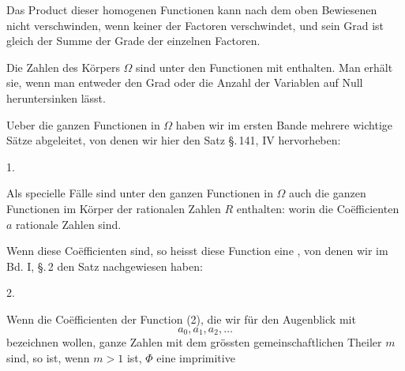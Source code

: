 
Das Product dieser homogenen Functionen kann nach dem oben Bewiesenen nicht verschwinden, wenn keiner der Factoren verschwindet, und sein Grad ist gleich der Summe der Grade der einzelnen Factoren.

Die Zahlen des K\"orpers $\Omega$ sind unter den Functionen mit enthalten. Man erh\"alt sie, wenn man entweder den Grad oder die Anzahl der Variablen auf Null heruntersinken l\"asst.

Ueber die ganzen Functionen in $\Omega$ haben wir im ersten Bande mehrere wichtige S\"atze abgeleitet, von denen wir hier den Satz \S.\,141, IV hervorheben:

1. 

Als specielle F\"alle sind unter den ganzen Functionen in $\Omega$ auch die ganzen Functionen im K\"orper der rationalen Zahlen $R$ enthalten:
worin die Co\"efficienten $a$ rationale Zahlen sind.

Wenn diese Co\"efficienten  sind, so heisst diese Function eine , von denen wir im Bd. I, \S.\,2 den Satz nachgewiesen haben:

2. 

Wenn die Co\"efficienten der Function (2), die wir f\"ur den Augenblick mit
\[ a_0, a_1, a_2, \ldots \]
bezeichnen wollen, ganze Zahlen mit dem gr\"ossten gemeinschaftlichen Theiler $m$ sind, so ist, wenn $m>1$ ist, $\Phi$ eine imprimitive 
